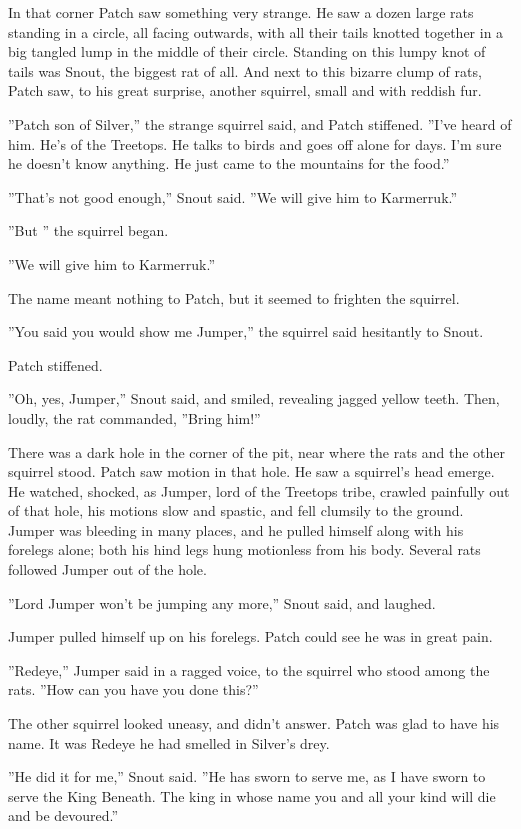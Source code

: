 \documentclass[12pt]{book}
\begin{document}
In that corner Patch saw something very strange. He saw a dozen large rats standing in a circle, all facing outwards, with all their tails knotted together in a big tangled lump in the middle of their circle. Standing on this lumpy knot of tails was Snout, the biggest rat of all. And next to this bizarre clump of rats, Patch saw, to his great surprise, another squirrel, small and with reddish fur.

''Patch son of Silver,'' the strange squirrel said, and Patch stiffened. ''I've heard of him. He's of the Treetops. He talks to birds and goes off alone for days. I'm sure he doesn't know anything. He just came to the mountains for the food.''

''That's not good enough,'' Snout said. ''We will give him to Karmerruk.''

''But %
'' the squirrel began.

''We will give him to Karmerruk.''

The name meant nothing to Patch, but it seemed to frighten the squirrel.

''You said you would show me Jumper,'' the squirrel said hesitantly to Snout.

Patch stiffened.

''Oh, yes, Jumper,'' Snout said, and smiled, revealing jagged yellow teeth. Then, loudly, the rat commanded, ''Bring him!''

There was a dark hole in the corner of the pit, near where the rats and the other squirrel stood. Patch saw motion in that hole. He saw a squirrel's head emerge. He watched, shocked, as Jumper, lord of the Treetops tribe, crawled painfully out of that hole, his motions slow and spastic, and fell clumsily to the ground. Jumper was bleeding in many places, and he pulled himself along with his forelegs alone; both his hind legs hung motionless from his body. Several rats followed Jumper out of the hole.

''Lord Jumper won't be jumping any more,'' Snout said, and laughed.

Jumper pulled himself up on his forelegs. Patch could see he was in great pain.

''Redeye,'' Jumper said in a ragged voice, to the squirrel who stood among the rats. ''How can you have you done this?''

The other squirrel looked uneasy, and didn't answer. Patch was glad to have his name. It was Redeye he had smelled in Silver's drey.

''He did it for me,'' Snout said. ''He has sworn to serve me, as I have sworn to serve the King Beneath. The king in whose name you and all your kind will die and be devoured.''
\end{document}
